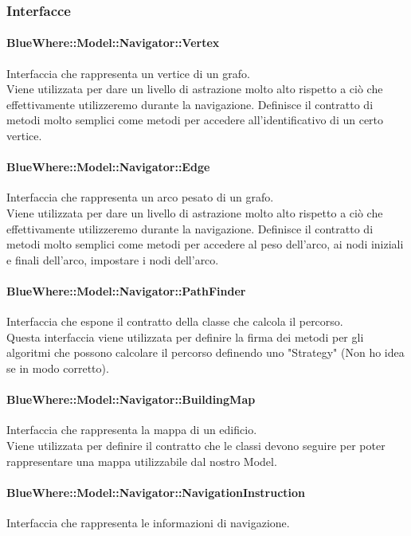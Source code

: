 \documentclass[../SpecificaTecnica.tex]{subfiles}
\begin{document}
			\subsubsection{Interfacce}
				\paragraph{BlueWhere::Model::Navigator::Vertex}
					Interfaccia che rappresenta un vertice di un grafo. \\ 
					Viene utilizzata per dare un livello di astrazione molto alto rispetto a ciò che effettivamente utilizzeremo durante la navigazione. Definisce il contratto di metodi molto semplici come metodi per accedere all'identificativo di un certo vertice.
				\paragraph{BlueWhere::Model::Navigator::Edge}
					Interfaccia che rappresenta un arco pesato di un grafo. \\ 
					Viene utilizzata per dare un livello di astrazione molto alto rispetto a ciò che effettivamente utilizzeremo durante la navigazione. Definisce il contratto di metodi molto semplici come metodi per accedere al peso dell'arco, ai nodi iniziali e finali dell'arco, impostare i nodi dell'arco.
				\paragraph{BlueWhere::Model::Navigator::PathFinder}
					Interfaccia che espone il contratto della classe che calcola il percorso. \\ 
					Questa interfaccia viene utilizzata per definire la firma dei metodi per gli algoritmi che possono calcolare il percorso definendo uno "Strategy" (Non ho idea se in modo corretto).
				\paragraph{BlueWhere::Model::Navigator::BuildingMap}
					Interfaccia che rappresenta la mappa di un edificio. \\
					Viene utilizzata per definire il contratto che le classi devono seguire per poter rappresentare una mappa utilizzabile dal nostro Model.
				\paragraph{BlueWhere::Model::Navigator::NavigationInstruction}
					Interfaccia che rappresenta le informazioni di navigazione. \\
\end{document}
